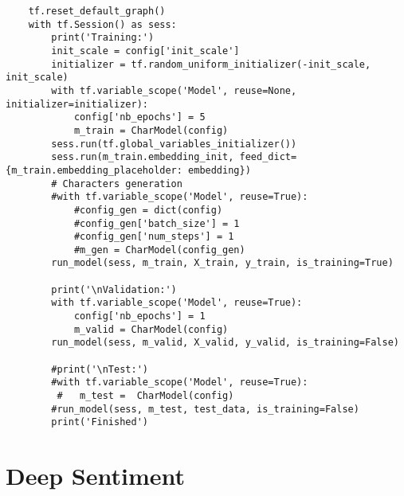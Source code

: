 \begin{lstlisting}
    tf.reset_default_graph()
    with tf.Session() as sess:
        print('Training:')
        init_scale = config['init_scale']
        initializer = tf.random_uniform_initializer(-init_scale, init_scale)    
        with tf.variable_scope('Model', reuse=None, initializer=initializer):
            config['nb_epochs'] = 5
            m_train = CharModel(config)
        sess.run(tf.global_variables_initializer())
        sess.run(m_train.embedding_init, feed_dict={m_train.embedding_placeholder: embedding})
        # Characters generation
        #with tf.variable_scope('Model', reuse=True):
            #config_gen = dict(config)
            #config_gen['batch_size'] = 1
            #config_gen['num_steps'] = 1
            #m_gen = CharModel(config_gen)
        run_model(sess, m_train, X_train, y_train, is_training=True)
        
        print('\nValidation:')
        with tf.variable_scope('Model', reuse=True):
            config['nb_epochs'] = 1
            m_valid = CharModel(config)
        run_model(sess, m_valid, X_valid, y_valid, is_training=False)
        
        #print('\nTest:')
        #with tf.variable_scope('Model', reuse=True):
         #   m_test =  CharModel(config)
        #run_model(sess, m_test, test_data, is_training=False)
        print('Finished')
\end{lstlisting}

\section{Deep Sentiment}

